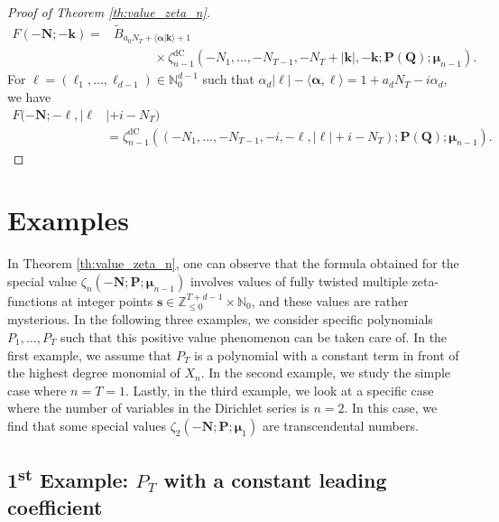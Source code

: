 \documentclass[a4paper,12pt]{article}
\theoremstyle{definition}
\numberwithin{equation}{section}
\newcommand{\dc}{\mathrm{dC}}
\begin{document}
\begin{proof}[Proof of Theorem \ref{th:value_zeta_n}]
\begin{align*}
    F(-\mathbf{N};-\mathbf{k})=&\widetilde{B}_{a_0N_T+\langle \boldsymbol{\alpha}|\mathbf{k}\rangle+1} \\
    & \hspace{38pt} \times \zeta_{n-1}^{\dc}(-N_1,\ldots,-N_{T-1},-N_T+|\mathbf{k}|,-\mathbf{k};\mathbf{P(Q)};\boldsymbol{\mu}_{n-1}).
\end{align*}
For $\boldsymbol{\ell}=(\ell_1,\ldots,\ell_{d-1}) \in \mathbb{N}_0^{d-1}$ such that $\alpha_d|\boldsymbol{\ell}|-\langle \boldsymbol{\alpha},\boldsymbol{\ell}\rangle=1+a_dN_T-i\alpha_d$, we have
\begin{align*}
    F(-\mathbf{N};-\boldsymbol{\ell},|\boldsymbol{\ell}&|+i-N_T) \\
    &= \zeta_{n-1}^{\dc}\left((-N_1,\ldots,-N_{T-1},-i,-\boldsymbol{\ell},|\boldsymbol{\ell}|+i-N_T);\mathbf{P(Q)};\boldsymbol{\mu}_{n-1}\right).
\end{align*}
\end{proof}

\section{Examples}
\label{application}

In Theorem \ref{th:value_zeta_n}, one can observe that the formula obtained for the special value $\zeta_{n}(-\mathbf{N};\mathbf{P};\boldsymbol{\mu}_{n-1})$ involves values of fully twisted multiple zeta-functions at integer points $\mathbf{s} \in \mathbb{Z}_{\leq 0}^{T+d-1} \times \mathbb{N}_0$, and these values are rather mysterious. In the following three examples, we consider specific polynomials $P_1,\ldots,P_T$ such that this positive value phenomenon can be taken care of. In the first example, we assume that $P_T$ is a polynomial with a constant term in front of the highest degree monomial of $X_n$. 
In the second example, we study the simple case where $n=T=1$.
Lastly, in the third example, we look at a specific case where the number of variables in the Dirichlet series is $n=2$. In this case, we find that some special values $\zeta_{2}(-\mathbf{N};\mathbf{P};\boldsymbol{\mu}_1)$ are transcendental numbers. 

\subsection{\texorpdfstring{1\textsuperscript{st}}{First} Example: \texorpdfstring{$P_T$}{P} with a constant leading coefficient}
\end{document}
